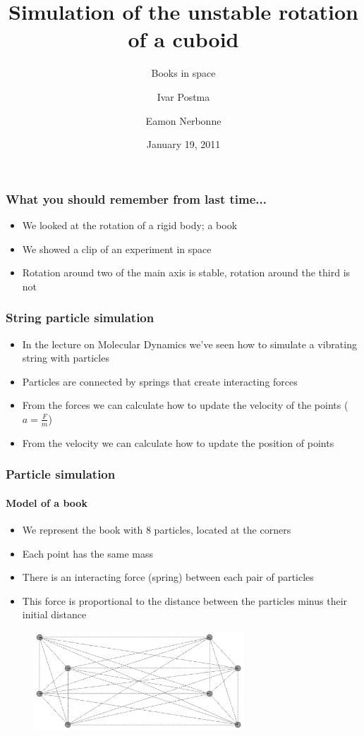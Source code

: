 \documentclass{beamer}
\title{Simulation of the unstable rotation of a cuboid}
\subtitle{Books in space}
\author{Ivar Postma \and Eamon Nerbonne}
\institute[University of Groningen]
{
  Introduction to Computational Science \\
  School for Computing and Cognition \\
  University of Groningen
}
\date{January 19, 2011}
\begin{document}
\frame{\titlepage}

\begin{frame}
 \frametitle{What you should remember from last time...}
 \begin{itemize}
  \item We looked at the rotation of a rigid body; a book
  \item We showed a clip of an experiment in space
  \item Rotation around two of the main axis is stable, rotation around the third is not
 \end{itemize}
\end{frame}

\begin{frame}
 \frametitle{String particle simulation}
 \begin{itemize}
  \item In the lecture on Molecular Dynamics we've seen how to simulate a vibrating string with particles
  \item Particles are connected by springs that create interacting forces
  \item From the forces we can calculate how to update the velocity of the points ($a = \frac{F}{m}$)
  \item From the velocity we can calculate how to update the position of points
 \end{itemize}
\end{frame}

\begin{frame}
 \frametitle{Particle simulation}
 \framesubtitle{Model of a book}
 \begin{itemize}
  \item We represent the book with 8 particles, located at the corners
  \item Each point has the same mass
  \item There is an interacting force (spring) between each pair of particles
  \item This force is proportional to the distance between the particles minus their initial distance
 \end{itemize}
 \pause
 \begin{figure}
  \centering
  \includegraphics[width=0.7\textwidth]{strings.pdf}
 \end{figure}
\end{frame}
\end{document}
